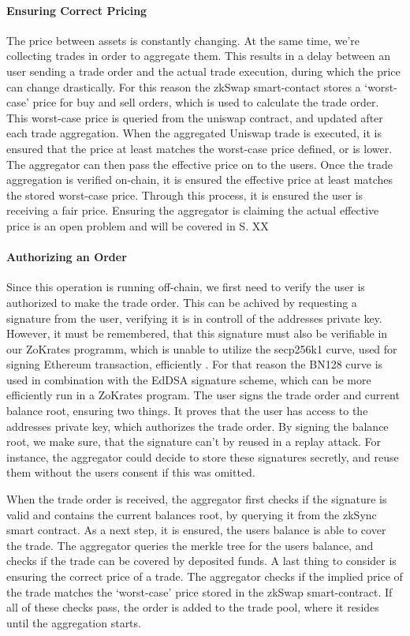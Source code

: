 \documentclass[../../thesis.tex]{subfiles}
\begin{document}
\paragraph{Ensuring Correct Pricing}
The price between assets is constantly changing. At the same time, we're collecting trades in order to aggregate them. This results in a delay between an user sending a trade order and the actual trade execution, during which the price can change drastically. For this reason the zkSwap smart-contact stores a `worst-case' price for buy and sell orders, which is used to calculate the trade order. This worst-case price is queried from the uniswap contract, and updated after each trade aggregation. When the aggregated Uniswap trade is executed, it is ensured that the price at least matches the worst-case price defined, or is lower. The aggregator can then pass the effective price on to the users. Once the trade aggregation is verified on-chain, it is ensured the effective price at least matches the stored worst-case price. Through this process, it is ensured the user is receiving a fair price. Ensuring the aggregator is claiming the actual effective price is an open problem and will be covered in S. XX

\paragraph{Authorizing an Order}
Since this operation is running off-chain, we first need to verify the user is authorized to make the trade order. This can be achived by requesting a signature from the user, verifying it is in controll of the addresses private key. However, it must be remembered, that this signature must also be verifiable in our ZoKrates programm, which is unable to utilize the secp256k1 curve, used for signing Ethereum transaction, efficiently \cite{deml_2019}. For that reason the BN128 curve is used in combination with the EdDSA signature scheme, which can be more efficiently run in a ZoKrates program. The user signs the trade order and current balance root, ensuring two things. It proves that the user has access to the addresses private key, which authorizes the trade order. By signing the balance root, we make sure, that the signature can't by reused in a replay attack. For instance, the aggregator could decide to store these signatures secretly, and reuse them without the users consent if this was omitted. 

When the trade order is received, the aggregator first checks if the signature is valid and contains the current balances root, by querying it from the zkSync smart contract. As a next step, it is ensured, the users balance is able to cover the trade. The aggregator queries the merkle tree for the users balance, and checks if the trade can be covered by deposited funds. A last thing to consider is ensuring the correct price of a trade. The aggregator checks if the implied price of the trade matches the `worst-case' price stored in the zkSwap smart-contract. If all of these checks pass, the order is added to the trade pool, where it resides until the aggregation starts.  
\end{document}

